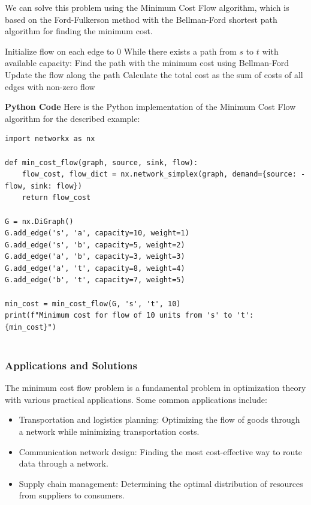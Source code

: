 \documentclass[12pt]{book} %
\begin{document}
We can solve this problem using the Minimum Cost Flow algorithm, which is based on the Ford-Fulkerson method with the Bellman-Ford shortest path algorithm for finding the minimum cost.
\FloatBarrier
\begin{algorithm}
\caption{Minimum Cost Flow Algorithm}
\begin{algorithmic}[1]
\State Initialize flow on each edge to 0
\State While there exists a path from $s$ to $t$ with available capacity:
\State \hspace{10mm} Find the path with the minimum cost using Bellman-Ford
\State \hspace{10mm} Update the flow along the path
\State Calculate the total cost as the sum of costs of all edges with non-zero flow
\end{algorithmic}
\end{algorithm}
\FloatBarrier
\textbf{Python Code}
\FloatBarrier
Here is the Python implementation of the Minimum Cost Flow algorithm for the described example:
\FloatBarrier
\begin{lstlisting}
import networkx as nx

def min_cost_flow(graph, source, sink, flow):
    flow_cost, flow_dict = nx.network_simplex(graph, demand={source: -flow, sink: flow})
    return flow_cost

G = nx.DiGraph()
G.add_edge('s', 'a', capacity=10, weight=1)
G.add_edge('s', 'b', capacity=5, weight=2)
G.add_edge('a', 'b', capacity=3, weight=3)
G.add_edge('a', 't', capacity=8, weight=4)
G.add_edge('b', 't', capacity=7, weight=5)

min_cost = min_cost_flow(G, 's', 't', 10)
print(f"Minimum cost for flow of 10 units from 's' to 't': {min_cost}")
    
\end{lstlisting}
\subsubsection{Applications and Solutions}
The minimum cost flow problem is a fundamental problem in optimization theory with various practical applications. Some common applications include:
\begin{itemize}
    \item Transportation and logistics planning: Optimizing the flow of goods through a network while minimizing transportation costs.
    \item Communication network design: Finding the most cost-effective way to route data through a network.
    \item Supply chain management: Determining the optimal distribution of resources from suppliers to consumers.
\end{itemize}
\FloatBarrier
\end{document}
